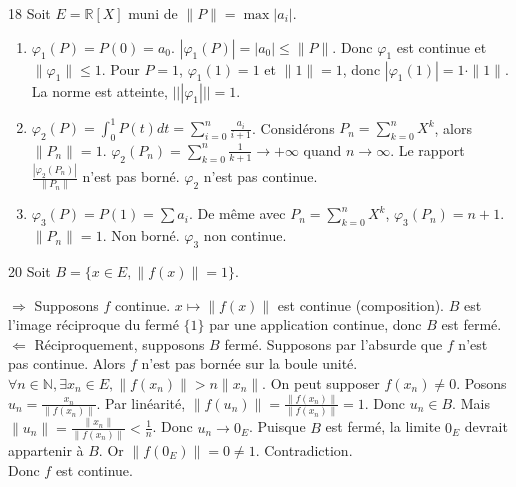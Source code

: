 \begin{correction}{18}
Soit $E = \mathbb{R}[X]$ muni de $\|P\| = \max |a_{i}|$.

\begin{enumerate}
    \item $\varphi_{1}(P) = P(0) = a_{0}$.
    $|\varphi_{1}(P)| = |a_{0}| \le \|P\|$. Donc $\varphi_{1}$ est continue et $\|\varphi_{1}\| \le 1$.
    Pour $P=1$, $\varphi_{1}(1)=1$ et $\|1\|=1$, donc $|\varphi_{1}(1)| = 1 \cdot \|1\|$.
    La norme est atteinte, $|||\varphi_{1}||| = 1$.

    \item $\varphi_{2}(P) = \int_{0}^{1} P(t) dt = \sum_{i=0}^{n} \frac{a_{i}}{i+1}$.
    Considérons $P_{n} = \sum_{k=0}^{n} X^{k}$, alors $\|P_{n}\| = 1$.
    $\varphi_{2}(P_{n}) = \sum_{k=0}^{n} \frac{1}{k+1} \to +\infty$ quand $n \to \infty$.
    Le rapport $\frac{|\varphi_{2}(P_{n})|}{\|P_{n}\|}$ n'est pas borné.
    $\varphi_{2}$ n'est pas continue.

    \item
    $\varphi_{3}(P) = P(1) = \sum a_{i}$.
    De même avec $P_{n} = \sum_{k=0}^{n} X^{k}$, $\varphi_{3}(P_{n}) = n+1$.
    $\|P_{n}\| = 1$. Non borné. $\varphi_{3}$ non continue.
\end{enumerate}
\end{correction}

\begin{correction}{20}
Soit $B = \{x \in E, \|f(x)\| = 1\}$.

$\Rightarrow$ Supposons $f$ continue. $x \mapsto \|f(x)\|$ est continue (composition).
$B$ est l'image réciproque du fermé $\{1\}$ par une application continue, donc $B$ est fermé. \\

$\Leftarrow$ Réciproquement, supposons $B$ fermé. Supposons par l'absurde que $f$ n'est pas continue.
Alors $f$ n'est pas bornée sur la boule unité.
$\forall n \in \mathbb{N}, \exists x_{n} \in E, \|f(x_{n})\| > n \|x_{n}\|$.
On peut supposer $f(x_{n}) \neq 0$.
Posons $u_{n} = \frac{x_{n}}{\|f(x_{n})\|}$.
Par linéarité, $\|f(u_{n})\| = \frac{\|f(x_{n})\|}{\|f(x_{n})\|} = 1$. Donc $u_{n} \in B$.
Mais $\|u_{n}\| = \frac{\|x_{n}\|}{\|f(x_{n})\|} < \frac{1}{n}$.
Donc $u_{n} \to 0_{E}$.
Puisque $B$ est fermé, la limite $0_{E}$ devrait appartenir à $B$.
Or $\|f(0_{E})\| = 0 \neq 1$. Contradiction. \\

Donc $f$ est continue.
\end{correction}

